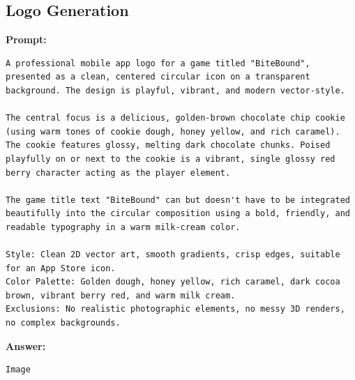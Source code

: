 \subsection{Logo Generation}

\textbf{Prompt:}
\begin{lstlisting}[language={}, breaklines=true]
A professional mobile app logo for a game titled "BiteBound", presented as a clean, centered circular icon on a transparent background. The design is playful, vibrant, and modern vector-style.

The central focus is a delicious, golden-brown chocolate chip cookie (using warm tones of cookie dough, honey yellow, and rich caramel). The cookie features glossy, melting dark chocolate chunks. Poised playfully on or next to the cookie is a vibrant, single glossy red berry character acting as the player element.

The game title text "BiteBound" can but doesn't have to be integrated beautifully into the circular composition using a bold, friendly, and readable typography in a warm milk-cream color.

Style: Clean 2D vector art, smooth gradients, crisp edges, suitable for an App Store icon.
Color Palette: Golden dough, honey yellow, rich caramel, dark cocoa brown, vibrant berry red, and warm milk cream.
Exclusions: No realistic photographic elements, no messy 3D renders, no complex backgrounds. 
\end{lstlisting}

\textbf{Answer:}
\begin{lstlisting}[language={}, breaklines=true]
Image
\end{lstlisting}
